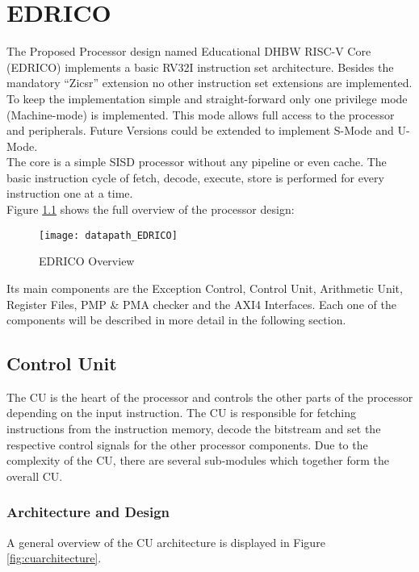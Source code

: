 
\chapter{EDRICO}

The Proposed Processor design named Educational DHBW RISC-V Core (EDRICO) implements a basic RV32I
instruction set architecture. Besides the mandatory “Zicsr” extension no other
instruction set extensions are implemented. To keep the implementation simple and
straight-forward only one privilege mode (Machine-mode) is implemented. This mode
allows full access to the processor and peripherals. Future Versions could be
extended to implement S-Mode and U-Mode.\\
The core is a simple \acf{SISD} processor without any pipeline or even cache. The basic instruction cycle of fetch, decode, execute, store is performed for every instruction one at a time.\\
Figure \ref{fig:edricooverview} shows the full overview of the processor design:

\begin{figure}[H]
	\centering
	\texttt{[image: datapath\_EDRICO]}
	\caption{EDRICO Overview}
	\label{fig:edricooverview}
\end{figure}

Its main components are the Exception Control, Control Unit, Arithmetic Unit,
Register Files, PMP \& PMA checker and the AXI4 Interfaces.
Each one of the components will be described in more detail in the following section.

\section{Control Unit}
The \ac{CU} is the heart of the processor and controls the other parts of the processor depending on the input instruction. The CU is responsible for fetching instructions from the instruction memory, decode the bitstream and set the respective control signals for the other processor components. Due to the complexity of the CU, there are several sub-modules which together form the overall CU.
\subsection{Architecture and Design}
\label{CU_arch}
A general overview of the CU architecture is displayed in Figure \ref{fig:cuarchitecture}. 

